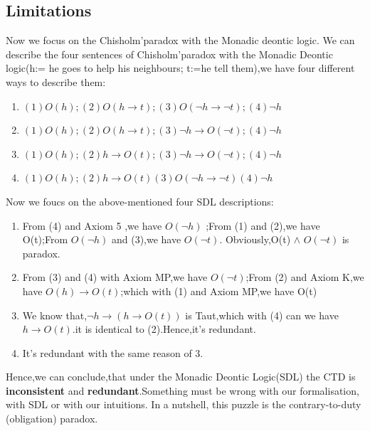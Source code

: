 \documentclass{article}
\begin{document}
\subsection{Limitations}
Now we focus on the Chisholm'paradox with the Monadic deontic logic.
We can describe the four sentences of Chisholm'paradox with the Monadic Deontic logic(h:= he goes to help his neighbours; t:=he tell them),we have four different ways to describe them:
\begin{enumerate}
\item $(1)O(h);(2)O(h\to t);(3)O(\neg h\to \neg t);(4) \neg h$
\item $(1)O(h);(2)O(h \to t);(3) \neg h \to O (\neg t); (4) \neg h$
\item $(1)O(h);(2)h\to O(t);(3)\neg h \to O(\neg t) ;(4)\neg h $
\item $ (1)O(h);(2)h\to O(t)(3)O(\neg h\to \neg t)(4)\neg h$
\end{enumerate}
Now we foucs on the above-mentioned four SDL descriptions:
\begin{enumerate}
\item From (4) and Axiom 5 ,we have $O(\neg h) $ ;From (1) and (2),we have O(t);From $O(\neg h)$ and (3),we have $ O(\neg t)$. Obviously,O(t) $\wedge$ $O(\neg t)$ is paradox.
\item From (3) and (4) with Axiom MP,we have $O(\neg t)$;From (2) and Axiom K,we have $O(h)\to O(t) $;which with (1) and Axiom MP,we have O(t)
\item We know that,$ \neg h \to (h \to O(t))$ is Taut,which with (4) can we have $ h \to O(t)$.it is identical to (2).Hence,it's redundant.
\item It's redundant with the same reason of 3.
\end{enumerate}
Hence,we can conclude,that under the Monadic Deontic Logic(SDL) the CTD is
\textbf{inconsistent} and \textbf{redundant}.Something must be wrong with our formalisation, with SDL or with our intuitions. In a nutshell, this puzzle is the contrary-to-duty
(obligation) paradox.\\
\end{document}
